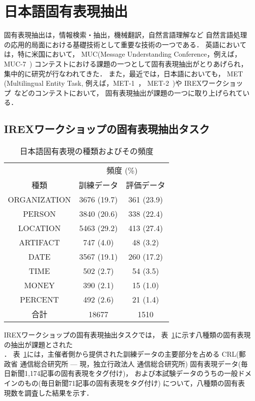 \section{日本語固有表現抽出}
\label{sec:JNE}

固有表現抽出は，情報検索・抽出，機械翻訳，自然言語理解など
自然言語処理の応用的局面における基礎技術として重要な技術の一つである．
英語においては，特に米国において，
MUC(Message Understanding Conference，例えば，MUC-7~\cite{MUC98aNLP})
コンテストにおける課題の一つとして固有表現抽出がとりあげられ，
集中的に研究が行なわれてきた．
また，最近では，日本語においても，
MET (Multilingual Entity Task, 例えば，MET-1~\cite{Maiorano96a}，
MET-2~\cite{MUC98aNLP})や
IREXワークショップ~\cite{IREX99aj}などのコンテストにおいて，
固有表現抽出が課題の一つに取り上げられている．

\subsection{IREXワークショップの固有表現抽出タスク}

\begin{table}
\begin{center}
\caption{日本語固有表現の種類およびその頻度}
\label{tab:irex_tag}
\begin{tabular}{|c||c|c|} \hline
        & \multicolumn{2}{|c|}{頻度 (\%)} \\ \cline{2-3}
種類 & 訓練データ & 評価データ \\ \hline
ORGANIZATION & 3676 (19.7) & 361 (23.9) \\
PERSON & 3840 (20.6) & 338 (22.4) \\
LOCATION & 5463 (29.2) & 413 (27.4) \\
ARTIFACT & 747 (4.0) & 48 (3.2) \\
DATE & 3567 (19.1) & 260 (17.2) \\
TIME & 502 (2.7) & 54 (3.5) \\
MONEY & 390 (2.1) & 15 (1.0) \\
PERCENT & 492 (2.6) & 21 (1.4) \\ \hline
合計 & 18677 & 1510 \\ \hline
\end{tabular}
\end{center}
\end{table}

IREXワークショップの固有表現抽出タスクでは，
表~\ref{tab:irex_tag}に示す八種類の固有表現の抽出が課題とされた\\
\cite{IREX99aj}．
表~\ref{tab:irex_tag}には，主催者側から提供された訓練データの主要部分を占める
CRL(郵政省 通信総合研究所 --- 現，独立行政法人 通信総合研究所)
固有表現データ(毎日新聞1,174記事の固有表現をタグ付け)，
および本試験データのうちの一般ドメインのもの(毎日新聞71記事の固有表現をタグ付け)
について，八種類の固有表現数を調査した結果を示す．

